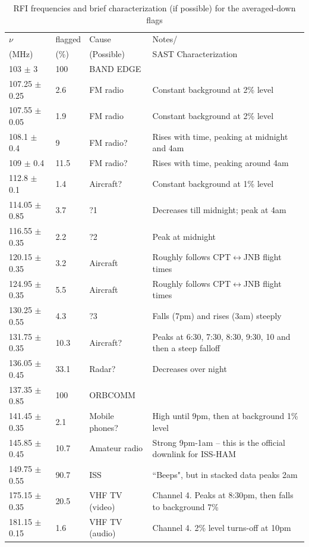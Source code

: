 \documentclass[10pt,a4paper]{article}
\begin{document}
\begin{table}
\centering
\small
\caption{RFI frequencies and brief characterization (if possible) for the averaged-down flags}
\begin{tabular}{llll}
\hline
$\nu$ 	&	flagged 	&	Cause	&	Notes/	\\
(MHz) & (\%) & (Possible) &SAST Characterization\\
\hline
103	$\pm$	3	&	100	&	BAND EDGE	&		\\
107.25	$\pm$	0.25	&	2.6	&	FM radio	&	Constant background at 2\% level	\\
107.55	$\pm$	0.05	&	1.9	&	FM radio	&	Constant background at 2\% level	\\
108.1	$\pm$	0.4	&	9	&	FM radio?	&	Rises with time, peaking at midnight and 4am	\\
109	$\pm$	0.4	&	11.5	&	FM radio?	&	Rises with time, peaking around 4am	\\
112.8	$\pm$	0.1	&	1.4	&	Aircraft?	&	Constant background at 1\% level	\\
114.05	$\pm$	0.85	&	3.7	&	?1	&	Decreases till midnight; peak at 4am	\\
116.55	$\pm$	0.35	&	2.2	&	?2	&	Peak at midnight	\\
120.15	$\pm$	0.35	&	3.2	&	Aircraft	&	Roughly follows CPT$\leftrightarrow$JNB flight times	\\
124.95	$\pm$	0.35	&	5.5	&	Aircraft	&	Roughly follows CPT$\leftrightarrow$JNB flight times	\\
130.25	$\pm$	0.55	&	4.3	&	?3	&	Falls (7pm) and rises (3am) steeply 	\\
131.75	$\pm$	0.35	&	10.3	&	Aircraft?	&	Peaks at 6:30, 7:30, 8:30, 9:30, 10 and then a steep falloff	\\
136.05	$\pm$	0.45	&	33.1	&	Radar?	&	Decreases over night	\\
137.35	$\pm$	0.85	&	100	&	ORBCOMM	&		\\
141.45	$\pm$	0.35	&	2.1	&	Mobile phones?	&	High until 9pm, then at background 1\% level	\\
145.85	$\pm$	0.45	&	10.7	&	Amateur radio& Strong 9pm-1am -- this is the official downlink for ISS-HAM	\\
149.75	$\pm$	0.55	&	90.7	&	ISS	&	``Beeps", but in stacked data peaks 2am	\\
175.15	$\pm$	0.35	&	20.5	&	VHF TV	 (video) &	 Channel 4. Peaks at 8:30pm, then falls to background 7\%	\\
181.15	$\pm$	0.15	&	1.6	&	VHF TV (audio) & Channel 4. 2\% level turns-off at 10pm	\\

\end{tabular}
\end{table}
\end{document}
